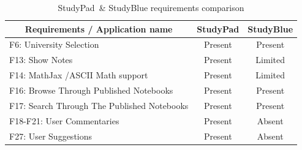 \documentclass[thesis=B,english]{FITthesis}[2012/10/20]
\newcommand{\appname}{StudyPad}
\begin{document}
\begin{table}[H]
\caption{\appname\ \& StudyBlue requirements comparison}
\label{tab:studyblue}
\begin{tabular}{|l|c|c|}
\hline
\multicolumn{1}{|c|}{\textbf{Requirements / Application name}} & \multicolumn{1}{l|}{\textbf{StudyPad}} & \multicolumn{1}{l|}{\textbf{StudyBlue}} \\ \hline
F6: University Selection                                       & Present                                & Present                                \\ \hline
F13: Show Notes                                                & Present                                & Limited                                \\ \hline
F14: MathJax /ASCII Math support                               & Present                                & Limited                                \\ \hline
F16: Browse Through Published Notebooks                        & Present                                & Present                               \\ \hline
F17: Search Through The Published Notebooks                    & Present                                & Present                               \\ \hline
F18-F21: User Commentaries                                     & Present                                & Absent                                \\ \hline
F27: User Suggestions                                          & Present                                & Absent                               \\ \hline
\end{tabular}
\end{table}
\end{document}
